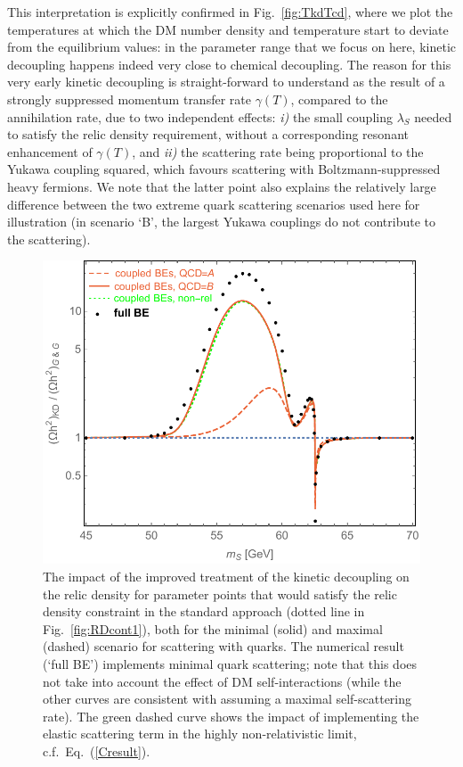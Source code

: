 \documentclass[twocolumn,showpacs,amsmath,amssymb,superscriptaddress,nofootinbib]{revtex4-1}
\begin{document}
This interpretation is explicitly confirmed in Fig.~\ref{fig:TkdTcd}, where we plot the temperatures at 
which the DM number density and temperature start to deviate from the equilibrium values:
in the parameter range that we focus on here, kinetic decoupling happens indeed very close to 
chemical decoupling. The reason for this very early kinetic decoupling  is straight-forward 
to understand as the result of a strongly suppressed momentum transfer rate $\gamma(T)$, 
compared to the annihilation rate, due to two independent 
effects: {\it i)} the small coupling $\lambda_S$ needed to satisfy the relic density
requirement, without a corresponding resonant enhancement of $\gamma(T)$, and {\it ii)} the scattering 
rate being proportional to the Yukawa coupling squared,
which favours scattering with Boltzmann-suppressed heavy fermions. We note that the 
latter point also explains the relatively large difference between the two extreme quark scattering 
scenarios used here for illustration (in scenario `B', the largest Yukawa couplings do not contribute
to the scattering). 

\begin{figure}
  \includegraphics[width=0.9\columnwidth]{Effect_AB_Drees}
  \caption{The impact of the improved treatment of the kinetic decoupling on the relic density for parameter
  points that would satisfy the relic density constraint in the standard approach (dotted line in Fig.~\ref{fig:RDcont1}),
  both for the minimal (solid) and maximal (dashed) scenario for scattering with quarks.
 The numerical result (`full BE') implements minimal quark scattering; note that this does not take 
 into account the effect of DM self-interactions (while the other curves are consistent with assuming a
 maximal self-scattering rate). The green dashed curve shows the impact of implementing the elastic 
 scattering term in the highly non-relativistic limit, c.f.~Eq.~(\ref{Cresult}).
  }
    \label{fig:effect}
\end{figure}
\end{document}
